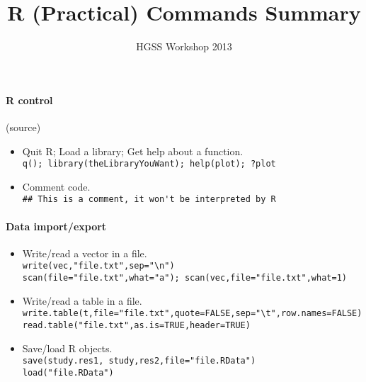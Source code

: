 \documentclass[a4paper,11pt]{article}
\title{R (Practical) Commands Summary}
\author{\tiny HGSS Workshop 2013}
\date{}
\begin{document}
\maketitle

\paragraph{R control} (source)
\begin{itemize} 
  \item Quit R; Load a library; Get help about a function. \\
    \verb!q(); library(theLibraryYouWant); help(plot); ?plot!
  \item Comment code. \\
    \verb!## This is a comment, it won't be interpreted by R!
\end{itemize}

\paragraph{Data import/export}
\begin{itemize} 
  \item Write/read a vector in a file. \\ 
    \verb!write(vec,"file.txt",sep="\n")! \\
    \verb!scan(file="file.txt",what="a"); scan(vec,file="file.txt",what=1)!
  \item Write/read a table in a file. \\ 
    \verb!write.table(t,file="file.txt",quote=FALSE,sep="\t",row.names=FALSE)! \\
    \verb!read.table("file.txt",as.is=TRUE,header=TRUE)! 
  \item Save/load R objects. \\
    \verb!save(study.res1, study,res2,file="file.RData")! \\
    \verb!load("file.RData")!
\end{itemize}


\end{document}
